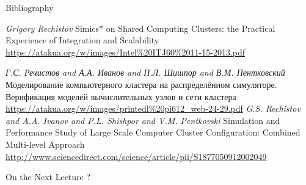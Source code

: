 \begin{frame}[allowframebreaks]{Bibliography}
\begin{thebibliography}{99}

   \textit{Grigory Rechistov} Simics* on Shared Computing Clusters: the Practical Experience of Integration and Scalability \url{https://atakua.org/w/images/Intel\%20ITJ60\%2011-15-2013.pdf}
  
   \textit{Г.С. Речистов and А.А. Иванов and П.Л. Шишпор and В.М. Пентковский} Моделирование компьютерного кластера на распределённом симуляторе. Верификация моделей вычислительных узлов и сети кластера \url{https://atakua.org/w/images/printedl\%20pi612_web-24-29.pdf}
   \textit{G.S. Rechistov and A.A. Ivanov and P.L. Shishpor and V.M. Pentkovski} Simulation and Performance Study of Large Scale Computer Cluster Configuration: Combined Multi-level Approach \url{http://www.sciencedirect.com/science/article/pii/S1877050912002049}  

\end{thebibliography}
\end{frame}

\begin{frame}{On the Next Lecture}
?
\end{frame}

\finalslide


